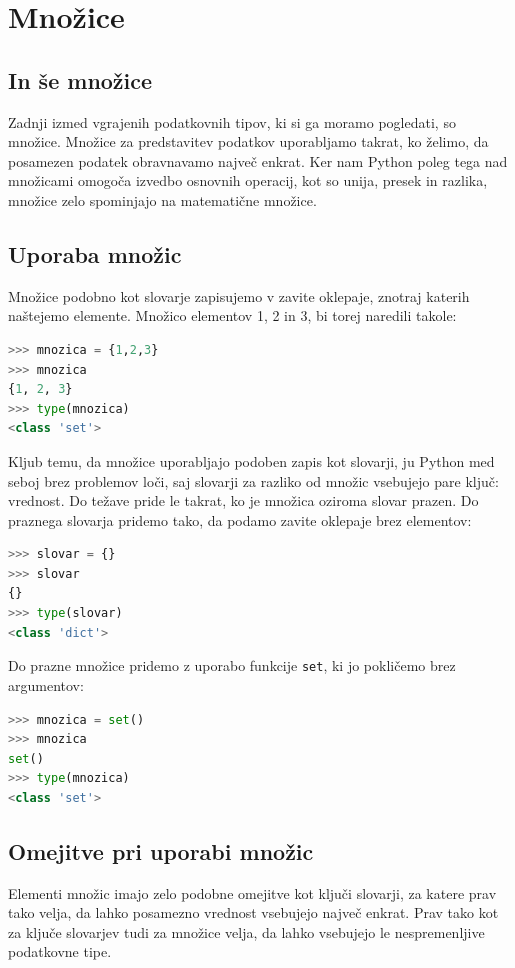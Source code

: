 \chapter{Množice}

\section{In še množice}

Zadnji izmed vgrajenih podatkovnih tipov, ki si ga moramo pogledati, so množice. Množice za predstavitev podatkov uporabljamo takrat, ko želimo, da posamezen podatek obravnavamo največ enkrat. Ker nam Python poleg tega nad množicami omogoča izvedbo osnovnih operacij, kot so unija, presek in razlika, množice zelo spominjajo na matematične množice. 

\section{Uporaba množic}

Množice podobno kot slovarje zapisujemo v zavite oklepaje, znotraj katerih naštejemo elemente. Množico elementov 1, 2 in 3, bi torej naredili takole:
\begin{lstlisting}[language=Python]
>>> mnozica = {1,2,3}
>>> mnozica
{1, 2, 3}
>>> type(mnozica)
<class 'set'>
\end{lstlisting}
Kljub temu, da množice uporabljajo podoben zapis kot slovarji, ju Python med seboj brez problemov loči, saj slovarji za razliko od množic vsebujejo pare ključ: vrednost. Do težave pride le takrat, ko je množica oziroma slovar prazen. Do praznega slovarja pridemo tako, da podamo zavite oklepaje brez elementov:
\begin{lstlisting}[language=Python]
>>> slovar = {}
>>> slovar
{}
>>> type(slovar)
<class 'dict'>
\end{lstlisting}
Do prazne množice pridemo z uporabo funkcije \texttt{set}, ki jo pokličemo brez argumentov:
\begin{lstlisting}[language=Python]
>>> mnozica = set()
>>> mnozica
set()
>>> type(mnozica)
<class 'set'>
\end{lstlisting}

\section{Omejitve pri uporabi množic}

Elementi množic imajo zelo podobne omejitve kot ključi slovarji, za katere prav tako velja, da lahko posamezno vrednost vsebujejo največ enkrat. Prav tako kot za ključe slovarjev tudi za množice velja, da lahko vsebujejo le nespremenljive podatkovne tipe. 

